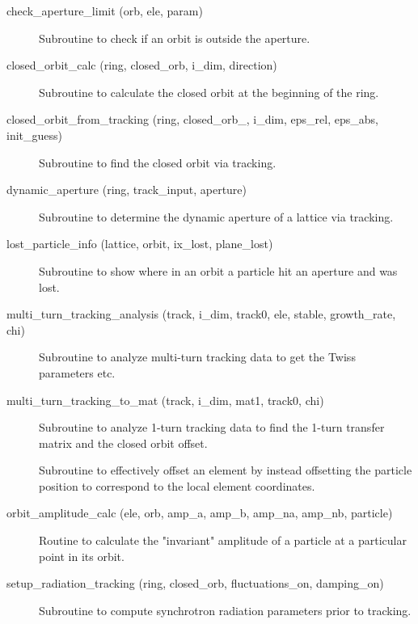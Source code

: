 \begin{description}

\item[check\_aperture\_limit (orb, ele, param)] \Newline
Subroutine to check if an orbit is outside the aperture. 

\item[closed\_orbit\_calc (ring, closed\_orb, i\_dim, direction)] \Newline 
Subroutine to calculate the closed orbit at the beginning of the ring.

\item[closed\_orbit\_from\_tracking (ring, closed\_orb\_, i\_dim, 
eps\_rel, eps\_abs, init\_guess)] \Newline
Subroutine to find the closed orbit via tracking. 

\item[dynamic\_aperture (ring, track\_input, aperture)] \Newline
Subroutine to determine the dynamic aperture of a lattice via tracking. 

\item[lost\_particle\_info (lattice, orbit, ix\_lost, plane\_lost)] \Newline 
Subroutine to show where in an orbit a particle hit an aperture and was lost.

\item[multi\_turn\_tracking\_analysis (track, i\_dim, track0, ele, 
stable, growth\_rate, chi)] \Newline
Subroutine to analyze multi-turn tracking data to get the Twiss
parameters etc.

\item[multi\_turn\_tracking\_to\_mat (track, i\_dim, 
mat1, track0, chi)] \Newline
Subroutine to analyze 1-turn tracking data to find the 1-turn transfer
matrix and the closed orbit offset.

\item[\protect\parbox{6in}{offset\_particle (ele, param, coord, set, 
set\_canonical, \\
\hspace*{2in} set\_tilt, set\_multipoles, set\_hvkicks, s\_pos)}] \Newline
Subroutine to effectively offset an element by instead offsetting 
the particle position to correspond to the local element coordinates. 

\item[orbit\_amplitude\_calc (ele, orb, amp\_a, amp\_b, amp\_na, amp\_nb, particle)] \Newline
Routine to calculate the "invariant" amplitude of a particle at a 
particular point in its orbit. 

\item[setup\_radiation\_tracking (ring, closed\_orb, fluctuations\_on, damping\_on)] \Newline
Subroutine to compute synchrotron radiation parameters prior to tracking. 


\end{description}
